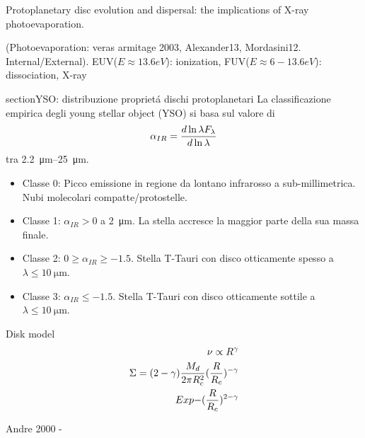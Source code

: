 \begin{workout}
	Protoplanetary disc evolution and dispersal: the implications of X-ray photoevaporation.
\end{workout}


\begin{workout}
	(Photoevaporation: veras armitage 2003, Alexander13, Mordasini12. Internal/External).
	EUV($E\approx13.6eV$): ionization, FUV($E\approx6-13.6eV$): dissociation, X-ray
\end{workout}

\begin{workout}
	section{YSO: distribuzione propriet\'a dischi protoplanetari}
	La classificazione empirica degli young stellar object (YSO) si basa sul valore di
	\begin{equation}
	\alpha_{IR}=\frac{d \ln{\lambda F_{\lambda}}}{d \ln{\lambda}}
	\end{equation}
	tra \SIrange{2.2}{25}{\micro\meter}.
	\begin{itemize}
		\item Classe 0: Picco emissione in regione da lontano infrarosso a sub-millimetrica. Nubi molecolari compatte/protostelle.
		\item Classe 1: $\alpha_{IR}>0$ a \SI{2}{\micro\meter}. La stella accresce la maggior parte della sua massa finale.
		\item Classe 2: $0\geq\alpha_{IR}\geq-1.5$. Stella T-Tauri con disco otticamente spesso a $\lambda\leq\SI{10}{\micro\meter}$.
		\item Classe 3: $\alpha_{IR}\leq-1.5$. Stella T-Tauri con disco otticamente sottile a $\lambda\leq\SI{10}{\micro\meter}$.
	\end{itemize}
\end{workout}

\begin{workout}
	Disk model
	\begin{align}
	\nu\propto R^{\gamma}\\
	\Sigma=(2-\gamma)\frac{M_d}{2\pi R_c^2}(\frac{R}{R_c})^{-\gamma}\\Exp{-(\frac{R}{R_c})^{2-\gamma}}
	\end{align}
\end{workout}


\begin{workout}
	Andre 2000 - 
\end{workout}

